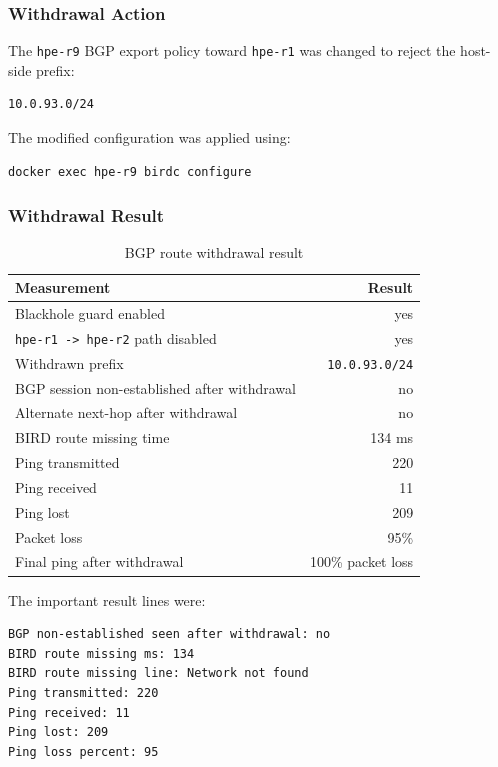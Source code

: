 \subsubsection{Withdrawal Action}

The \texttt{hpe-r9} BGP export policy toward \texttt{hpe-r1} was changed to reject the host-side prefix:

\begin{verbatim}
10.0.93.0/24
\end{verbatim}

The modified configuration was applied using:

\begin{verbatim}
docker exec hpe-r9 birdc configure
\end{verbatim}

\subsubsection{Withdrawal Result}

\begin{table}[h]
\centering
\begin{tabular}{|l|r|}
\hline
\textbf{Measurement} & \textbf{Result} \\
\hline
Blackhole guard enabled & yes \\
\hline
\texttt{hpe-r1 -> hpe-r2} path disabled & yes \\
\hline
Withdrawn prefix & \texttt{10.0.93.0/24} \\
\hline
BGP session non-established after withdrawal & no \\
\hline
Alternate next-hop after withdrawal & no \\
\hline
BIRD route missing time & 134 ms \\
\hline
Ping transmitted & 220 \\
\hline
Ping received & 11 \\
\hline
Ping lost & 209 \\
\hline
Packet loss & 95\% \\
\hline
Final ping after withdrawal & 100\% packet loss \\
\hline
\end{tabular}
\caption{BGP route withdrawal result}
\end{table}

The important result lines were:

\begin{verbatim}
BGP non-established seen after withdrawal: no
BIRD route missing ms: 134
BIRD route missing line: Network not found
Ping transmitted: 220
Ping received: 11
Ping lost: 209
Ping loss percent: 95
\end{verbatim}


